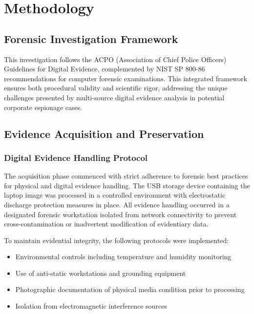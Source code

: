 \chapter{Methodology}

\section{Forensic Investigation Framework}
This investigation follows the ACPO (Association of Chief Police Officers) Guidelines for Digital Evidence, complemented by NIST SP 800-86 recommendations for computer forensic examinations. This integrated framework ensures both procedural validity and scientific rigor, addressing the unique challenges presented by multi-source digital evidence analysis in potential corporate espionage cases.

\section{Evidence Acquisition and Preservation}

\subsection{Digital Evidence Handling Protocol}
The acquisition phase commenced with strict adherence to forensic best practices for physical and digital evidence handling. The USB storage device containing the laptop image was processed in a controlled environment with electrostatic discharge protection measures in place. All evidence handling occurred in a designated forensic workstation isolated from network connectivity to prevent cross-contamination or inadvertent modification of evidentiary data.

To maintain evidential integrity, the following protocols were implemented:
\begin{itemize}
    \item Environmental controls including temperature and humidity monitoring
    \item Use of anti-static workstations and grounding equipment
    \item Photographic documentation of physical media condition prior to processing
    \item Isolation from electromagnetic interference sources
\end{itemize}

